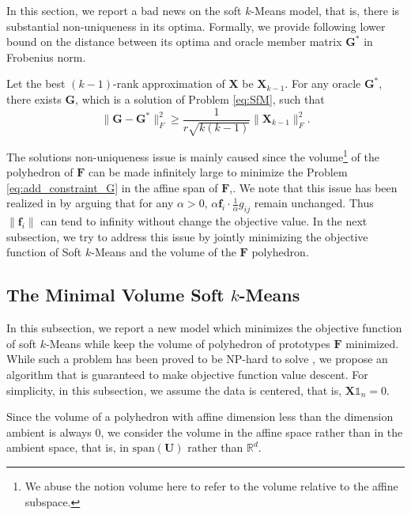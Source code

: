 \documentclass[journal]{IEEEtran}
\begin{document}
In this section, we report a bad news on the soft $k$-Means model, that is,
there is substantial non-uniqueness in its optima. 
Formally, we provide following lower bound on the distance between its optima and oracle 
member matrix $\mathbf{G}^*$ in Frobenius norm.
\begin{thm}
	Let the best $(k-1)$-rank approximation of $\mathbf{X}$ be $\mathbf{X}_{k-1}$.
	For any oracle $\mathbf{G}^*$, there exists $\mathbf{G}$, which is a solution of Problem \eqref{eq:SfM},  such that 
	\[
	\|\mathbf{G} - \mathbf{G}^*\|_F^2 \geq \frac{1}{r\sqrt{k(k-1)}} \| \mathbf{X}_{k-1}\|_F^2.
	\]
\end{thm}

\begin{remark}
	The solutions non-uniqueness issue is mainly caused since
	the volume\footnote{We abuse the notion volume here to refer to the volume relative to the affine subspace.} of the polyhedron of $\mathbf{F}$ can be made infinitely
	large to minimize the Problem \eqref{eq:add_constraint_G} in the affine span of $\mathbf{F}$,.
	We note that this issue has been realized in \cite{nascimento2003modeling} by arguing
	that for any $\alpha > 0$, $\alpha\mathbf{f}_i \cdot \frac{1}{\alpha} g_{ij}$ remain unchanged.
	Thus $\|\mathbf{f}_i\|$ can tend to infinity without change the objective value.
	In the next subsection, we try to address this issue by jointly minimizing the objective function of Soft $k$-Means
	and the volume of the $\mathbf{F}$ polyhedron.
\end{remark}

\subsection{The Minimal Volume Soft $k$-Means}\label{sec:MVSkM}
In this subsection, we report a new model which minimizes the objective function of soft $k$-Means while keep the volume of polyhedron
of prototypes $\mathbf{F}$ minimized. While such a problem has been proved to be NP-hard to solve \cite{zhou2002algorithms}, 
we propose an algorithm that is guaranteed to make objective function value descent. For simplicity, in this subsection, we assume the data is centered, that is, $\mathbf{X}\mathbb{1}_n = 0$.

Since the volume of a polyhedron with affine dimension less than the dimension ambient is always $0$, we consider the volume in the affine space rather than in the ambient space, that is, in $\text{span}(\mathbf{U})$ rather than $\mathbb{R}^d$. 
\end{document}
